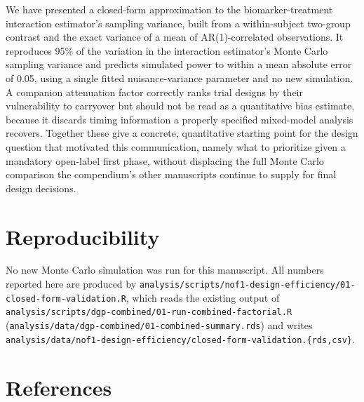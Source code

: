\documentclass[
  11pt,
]{article}
\begin{document}
We have presented a closed-form approximation to the
biomarker-treatment interaction estimator's sampling variance,
built from a within-subject two-group contrast and the exact
variance of a mean of AR(1)-correlated observations. It
reproduces 95\% of the variation in the
interaction estimator's Monte Carlo sampling variance and
predicts simulated power to within a mean absolute error of
0.05, using a single fitted nuisance-variance
parameter and no new simulation. A companion attenuation factor
correctly ranks trial designs by their vulnerability to carryover
but should not be read as a quantitative bias estimate, because
it discards timing information a properly specified mixed-model
analysis recovers. Together these give a concrete, quantitative
starting point for the design question that motivated this
communication, namely what to prioritize given a mandatory
open-label first phase, without displacing the full Monte Carlo
comparison the compendium's other manuscripts continue to supply
for final design decisions.

\section{Reproducibility}\label{reproducibility}

No new Monte Carlo simulation was run for this manuscript. All
numbers reported here are produced by
\texttt{analysis/scripts/nof1-design-efficiency/01-closed-form-validation.R},
which reads the existing output of
\texttt{analysis/scripts/dgp-combined/01-run-combined-factorial.R}
(\texttt{analysis/data/dgp-combined/01-combined-summary.rds}) and writes
\texttt{analysis/data/nof1-design-efficiency/closed-form-validation.\{rds,csv\}}.

\section*{References}\label{references}
\end{document}
